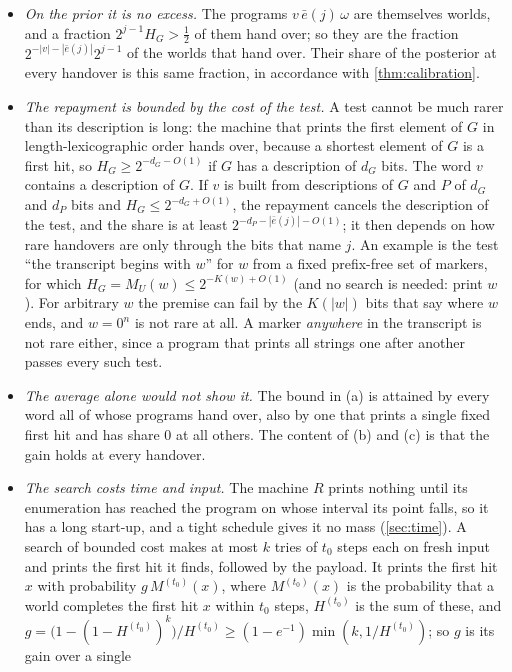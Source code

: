 \begin{itemize}[leftmargin=1.4em,itemsep=1pt,topsep=2pt]
\item \emph{On the prior it is no excess.} The programs $v\,\bar e(j)\,\omega$ are themselves worlds, and a
fraction $2^{j-1}H_G>\frac12$ of them hand over; so they are the fraction $2^{-|v|-|\bar e(j)|}2^{j-1}$ of the
worlds that hand over. Their share of the posterior at every handover is this same fraction, in accordance
with \cref{thm:calibration}.
\item \emph{The repayment is bounded by the cost of the test.} A test cannot be much rarer than its
description is long: the machine that prints the first element of $G$ in length-lexicographic order hands
over, because a shortest element of $G$ is a first hit, so $H_G\ge2^{-d_G-O(1)}$ if $G$ has a description of
$d_G$ bits. The word $v$ contains a description of $G$. If $v$ is built from descriptions of $G$ and $P$ of
$d_G$ and $d_P$ bits and $H_G\le2^{-d_G+O(1)}$, the repayment cancels the description of the test, and the
share is at least $2^{-d_P-|\bar e(j)|-O(1)}$; it then depends on how rare handovers are only through the bits
that name $j$. An example is the test ``the transcript begins with $w$'' for $w$ from a fixed prefix-free set
of markers, for which $H_G=M_U(w)\le2^{-K(w)+O(1)}$ (and no search is needed: print $w$). For arbitrary $w$
the premise can fail by the $K(|w|)$ bits that say where $w$ ends, and $w=0^n$ is not rare at all. A marker
\emph{anywhere} in the transcript is not rare either, since a program that prints all strings one after
another passes every such test.
\item \emph{The average alone would not show it.} The bound in (a) is attained by every word all of whose
programs hand over, also by one that prints a single fixed first hit and has share $0$ at all others. The
content of (b) and (c) is that the gain holds at every handover.
\item \emph{The search costs time and input.} The machine $R$ prints nothing until its enumeration has reached
the program on whose interval its point falls, so it has a long start-up, and a tight schedule gives it no
mass (\cref{sec:time}). A search of bounded cost makes at most $k$ tries of $t_0$ steps each on fresh input
and prints the first hit it finds, followed by the payload. It prints the first hit $x$ with probability
$g\,M^{(t_0)}(x)$, where $M^{(t_0)}(x)$ is the probability that a world completes the first hit $x$ within
$t_0$ steps, $H^{(t_0)}$ is the sum of these, and
$g=\bigl(1-(1-H^{(t_0)})^k\bigr)/H^{(t_0)}\ge(1-e^{-1})\min(k,1/H^{(t_0)})$; so $g$ is its gain over a single

\end{itemize}
